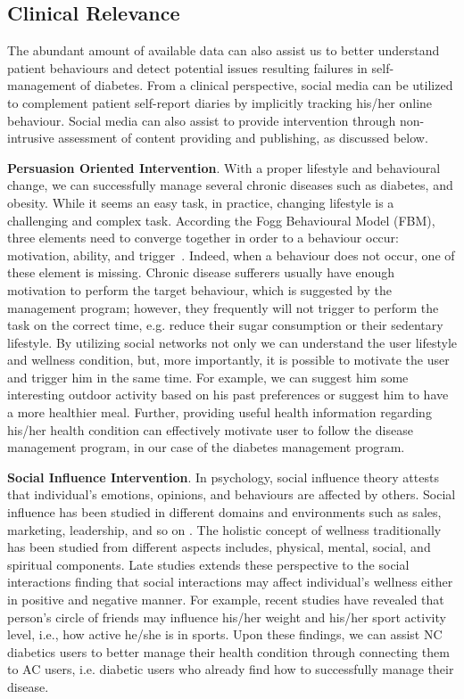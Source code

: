\documentclass{acm_proc_article-sp}
\begin{document}
\subsection{Clinical Relevance}
The abundant amount of available data can also assist us to better understand patient behaviours and detect potential issues resulting failures in self-management of diabetes. From a clinical perspective, social media can be utilized to complement patient self-report diaries by implicitly tracking his/her online behaviour. Social media can also assist to provide intervention through non-intrusive assessment of content providing and publishing, as discussed below.

\textbf{Persuasion Oriented Intervention}.
With a proper lifestyle and behavioural change, we can successfully manage several chronic diseases such as diabetes, and obesity. While it seems an easy task, in practice, changing lifestyle is a challenging and complex task. According the Fogg Behavioural Model (FBM), three elements need to converge together in order to a behaviour occur: motivation, ability, and trigger~\cite{fogg2010behavior}. Indeed, when a behaviour does not occur, one of these element is missing. Chronic disease sufferers usually have enough motivation to perform the target behaviour, which is suggested by the management program; however, they frequently will not trigger to perform the task on the correct time, e.g. reduce their sugar consumption or their sedentary lifestyle. By utilizing social networks not only we can understand the user lifestyle and wellness condition, but, more importantly, it is possible to motivate the user and trigger him in the same time. For example, we can suggest him some interesting outdoor activity based on his past preferences or suggest him to have a more healthier meal. Further, providing useful health information regarding his/her health condition can effectively motivate user to follow the disease management program, in our case of the diabetes management program.

\textbf{Social Influence Intervention}. In psychology, social influence theory attests that individual's emotions, opinions, and behaviours are affected by others. Social influence has been studied in different domains and environments such as sales, marketing, leadership, and so on \cite{kelman1958compliance}. The holistic concept of wellness traditionally has been studied from different aspects includes, physical, mental, social, and spiritual components.  Late studies extends these perspective to the social interactions finding that social interactions may affect individual's wellness either in positive and negative manner. For example, recent studies have revealed that person's circle of friends may influence his/her weight\cite{shoham2012actor} and his/her sport activity level, i.e., how active he/she is in sports. Upon these findings, we can assist NC diabetics users to better manage their health condition through connecting them to AC users, i.e. diabetic users who already find how to successfully manage their disease.
\end{document}
